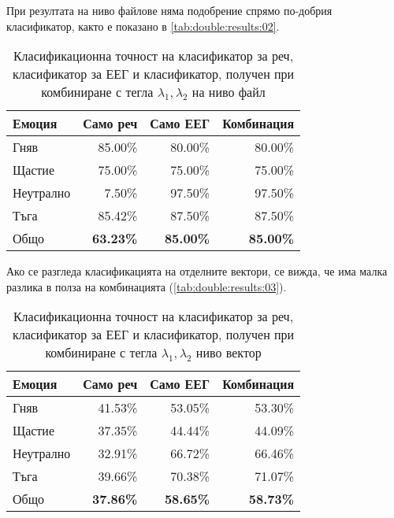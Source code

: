 \documentclass[main.tex]{subfiles}
\begin{document}
При резултата на ниво файлове няма подобрение спрямо по-добрия класификатор, както е показано в \autoref{tab:double:results:02}.

\begin{table}[h]
	\begin{center}
		\begin{tabular}{|l|r r r|}
			\hline
			Емоция    & Само реч         & Само ЕЕГ         & Комбинация     \\
			\hline
			Гняв      & 85.00\%          & 80.00\%          & 80.00\%          \\
			Щастие    & 75.00\%          & 75.00\%          & 75.00\%          \\
			Неутрално & 7.50\%           & 97.50\%          & 97.50\%          \\
			Тъга      & 85.42\%          & 87.50\%          & 87.50\%          \\
			\hline
			\hline
			Общо      & \textbf{63.23\%} & \textbf{85.00\%} & \textbf{85.00\%} \\
			\hline
		\end{tabular}
		\caption{Класификационна точност на класификатор за реч, класификатор за ЕЕГ и класификатор, получен при комбиниране с тегла $\lambda_1, \lambda_2$ на ниво файл}
		\label{tab:double:results:02}
	\end{center}
\end{table}

Ако се разгледа класификацията на отделните вектори, се вижда, че има малка разлика в полза на комбинацията (\autoref{tab:double:results:03}).

\begin{table}[h]
	\begin{center}
		\begin{tabular}{|l|r r r|}
			\hline
			Емоция    & Само реч         & Само ЕЕГ         & Комбинация     \\
			\hline
			Гняв      & 41.53\%          & 53.05\%          & 53.30\%          \\
			Щастие    & 37.35\%          & 44.44\%          & 44.09\%          \\
			Неутрално & 32.91\%           & 66.72\%          & 66.46\%          \\
			Тъга      & 39.66\%          & 70.38\%          & 71.07\%          \\
			\hline
			\hline
			Общо      & \textbf{37.86\%} & \textbf{58.65\%} & \textbf{58.73\%} \\
			\hline
		\end{tabular}
		\caption{Класификационна точност на класификатор за реч, класификатор за ЕЕГ и класификатор, получен при комбиниране с тегла $\lambda_1, \lambda_2$ ниво вектор}
		\label{tab:double:results:03}
	\end{center}
\end{table}
\end{document}
